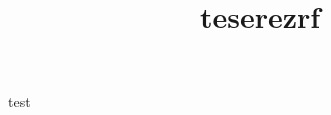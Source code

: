 \documentclass{beamer}
\title{teserezrf}
\begin{document}
\begin{frame}
	\titlepage
\end{frame}
\begin{frame}
	test
\end{frame}
\end{document}
